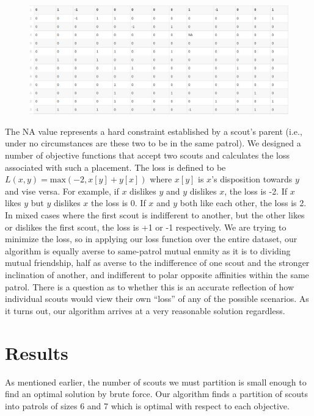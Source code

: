 \documentclass{amsart}
\theoremstyle{definition}
\theoremstyle{remark}
\numberwithin{equation}{section}
\begin{document}
\begin{figure}[h]
    \centering
    \includegraphics[scale=0.28]{data}
\end{figure}

The NA value represents a hard constraint established by a scout's parent (i.e., under no circumstances are these two to be in the same patrol). We designed a number of objective functions that accept two scouts and calculates the loss associated with such a placement. The loss is defined to be $L(x, y) = \text{max}(-2, x[y] + y[x])$ where $x[y]$ is $x$'s disposition towards $y$ and vise versa. For example, if $x$ dislikes $y$ and $y$ dislikes $x$, the loss is -2. If $x$ likes $y$ but $y$ dislikes $x$ the loss is 0. If $x$ and $y$ both like each other, the loss is 2. In mixed cases where the first scout is indifferent to another, but the other likes or dislikes the first scout, the loss is +1 or -1 respectively. We are trying to minimize the loss, so in applying our loss function over the entire dataset, our algorithm is equally averse to same-patrol mutual enmity as it is to dividing mutual friendship, half as averse to the indifference of one scout and the stronger inclination of another, and indifferent to polar opposite affinities within the same patrol. There is a question as to whether this is an accurate reflection of how individual scouts would view their own ``loss'' of any of the possible scenarios. As it turns out, our algorithm arrives at a very reasonable solution regardless. 
\section*{Results}
As mentioned earlier, the number of scouts we must partition is small enough to find an optimal solution by brute force. Our algorithm finds a partition of scouts into patrols of sizes 6 and 7 which is optimal with respect to each objective.
\end{document}
